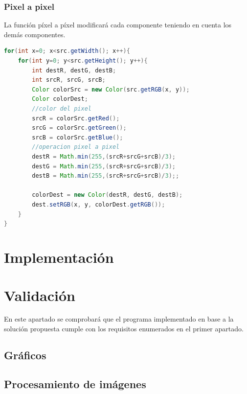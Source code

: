 \subsubsection{Pixel a pixel}
La función píxel a píxel modificará cada componente teniendo en cuenta los demás componentes.
\begin{lstlisting}[language=Java, caption=Operación pixel a pixel, label=lst:graddesc]
for(int x=0; x<src.getWidth(); x++){
    for(int y=0; y<src.getHeight(); y++){
        int destR, destG, destB;
        int srcR, srcG, srcB;
        Color colorSrc = new Color(src.getRGB(x, y));
        Color colorDest;
        //color del pixel
        srcR = colorSrc.getRed();
        srcG = colorSrc.getGreen();
        srcB = colorSrc.getBlue();
        //operacion pixel a pixel
        destR = Math.min(255,(srcR+srcG+srcB)/3);
        destG = Math.min(255,(srcR+srcG+srcB)/3);
        destB = Math.min(255,(srcR+srcG+srcB)/3);;
                
        colorDest = new Color(destR, destG, destB);
        dest.setRGB(x, y, colorDest.getRGB());
    }
}
\end{lstlisting}

\section{Implementación}
\section{Validación}
En este apartado se comprobará que el programa implementado en base a la solución propuesta cumple con los requisitos enumerados en el primer apartado.
\subsection{Gráficos}
\subsection{Procesamiento de imágenes}
